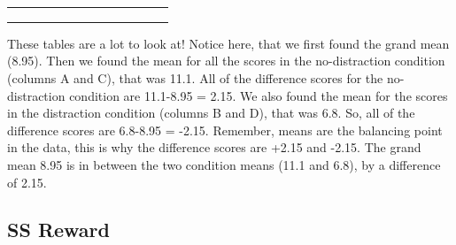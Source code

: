 \documentclass[
]{book}
\begin{document}
\begin{table}
\begin{tabular}{l|l|l|l|l|l|l|l|l|>{}l|>{}l|>{}l|>{}l}
\hline
\cellcolor{lightgreen}{Means} & \cellcolor{lightgreen}{9.6} & \cellcolor{lightgreen}{3.6} & \cellcolor{lightgreen}{12.6} & \cellcolor{lightgreen}{10} & \cellcolor{lightgreen}{} & \cellcolor{lightgreen}{} & \cellcolor{lightgreen}{} & \cellcolor{lightgreen}{} & \cellcolor{yellow}{} & \cellcolor{yellow}{} & \cellcolor{yellow}{} & \cellcolor{yellow}{}\\
\hline
\cellcolor{lightgreen}{Grand Mean} & \cellcolor{lightgreen}{8.95} & \cellcolor{lightgreen}{No Distraction} & \cellcolor{lightgreen}{11.1} & \cellcolor{lightgreen}{Distraction} & \cellcolor{lightgreen}{6.8} & \cellcolor{lightgreen}{} & \cellcolor{lightgreen}{} & \cellcolor{lightgreen}{} & \cellcolor{yellow}{} & \cellcolor{yellow}{} & \cellcolor{yellow}{} & \cellcolor{yellow}{}\\
\hline
\cellcolor{yellow}{sums} & \cellcolor{yellow}{} & \cellcolor{yellow}{} & \cellcolor{yellow}{} & \cellcolor{yellow}{} & \cellcolor{yellow}{} & \cellcolor{yellow}{} & \cellcolor{yellow}{} & \cellcolor{yellow}{Sums} & \cellcolor{yellow}{23.1125} & \cellcolor{yellow}{23.1125} & \cellcolor{yellow}{23.1125} & \cellcolor{yellow}{23.1125}\\
\hline
\cellcolor{yellow}{SS Distraction} & \cellcolor{yellow}{} & \cellcolor{yellow}{} & \cellcolor{yellow}{} & \cellcolor{yellow}{} & \cellcolor{yellow}{} & \cellcolor{yellow}{} & \cellcolor{yellow}{} & \cellcolor{yellow}{SS Distraction} & \cellcolor{yellow}{92.45} & \cellcolor{yellow}{} & \cellcolor{yellow}{} & \cellcolor{yellow}{}\\
\hline
\end{tabular}
\end{table}

These tables are a lot to look at! Notice here, that we first found the grand mean (8.95). Then we found the mean for all the scores in the no-distraction condition (columns A and C), that was 11.1. All of the difference scores for the no-distraction condition are 11.1-8.95 = 2.15. We also found the mean for the scores in the distraction condition (columns B and D), that was 6.8. So, all of the difference scores are 6.8-8.95 = -2.15. Remember, means are the balancing point in the data, this is why the difference scores are +2.15 and -2.15. The grand mean 8.95 is in between the two condition means (11.1 and 6.8), by a difference of 2.15.

\subsection{SS Reward}\label{ss-reward}
\end{document}
